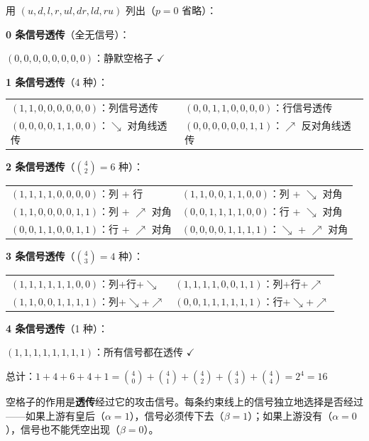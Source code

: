 \documentclass[12pt,a4paper]{article}
\begin{document}
\begin{exbox}
用 $(u,d,l,r,ul,dr,ld,ru)$ 列出（$p = 0$ 省略）：

\medskip
\textbf{0 条信号透传}（全无信号）：
\begin{center}
$(0,0,0,0,0,0,0,0)$：静默空格子 \quad $\checkmark$
\end{center}

\textbf{1 条信号透传}（4 种）：
\begin{center}
\begin{tabular}{ll}
$(1,1,0,0,0,0,0,0)$：列信号透传 & $(0,0,1,1,0,0,0,0)$：行信号透传 \\
$(0,0,0,0,1,1,0,0)$：$\searrow$ 对角线透传 & $(0,0,0,0,0,0,1,1)$：$\nearrow$ 反对角线透传
\end{tabular}
\end{center}

\textbf{2 条信号透传}（$\binom{4}{2} = 6$ 种）：
\begin{center}
\begin{tabular}{ll}
$(1,1,1,1,0,0,0,0)$：列 + 行 & $(1,1,0,0,1,1,0,0)$：列 + $\searrow$ 对角 \\
$(1,1,0,0,0,0,1,1)$：列 + $\nearrow$ 对角 & $(0,0,1,1,1,1,0,0)$：行 + $\searrow$ 对角 \\
$(0,0,1,1,0,0,1,1)$：行 + $\nearrow$ 对角 & $(0,0,0,0,1,1,1,1)$：$\searrow$ + $\nearrow$ 对角
\end{tabular}
\end{center}

\textbf{3 条信号透传}（$\binom{4}{3} = 4$ 种）：
\begin{center}
\begin{tabular}{ll}
$(1,1,1,1,1,1,0,0)$：列+行+$\searrow$ & $(1,1,1,1,0,0,1,1)$：列+行+$\nearrow$ \\
$(1,1,0,0,1,1,1,1)$：列+$\searrow$+$\nearrow$ & $(0,0,1,1,1,1,1,1)$：行+$\searrow$+$\nearrow$
\end{tabular}
\end{center}

\textbf{4 条信号透传}（1 种）：
\begin{center}
$(1,1,1,1,1,1,1,1)$：所有信号都在透传 \quad $\checkmark$
\end{center}

总计：$1 + 4 + 6 + 4 + 1 = \binom{4}{0} + \binom{4}{1} + \binom{4}{2} + \binom{4}{3} + \binom{4}{4} = 2^4 = 16$
\end{exbox}

\begin{sumbox}[空格子的物理含义]
空格子的作用是\textbf{透传}经过它的攻击信号。每条约束线上的信号独立地选择是否经过——如果上游有皇后（$\alpha = 1$），信号必须传下去（$\beta = 1$）；如果上游没有（$\alpha = 0$），信号也不能凭空出现（$\beta = 0$）。
\end{sumbox}
\end{document}
